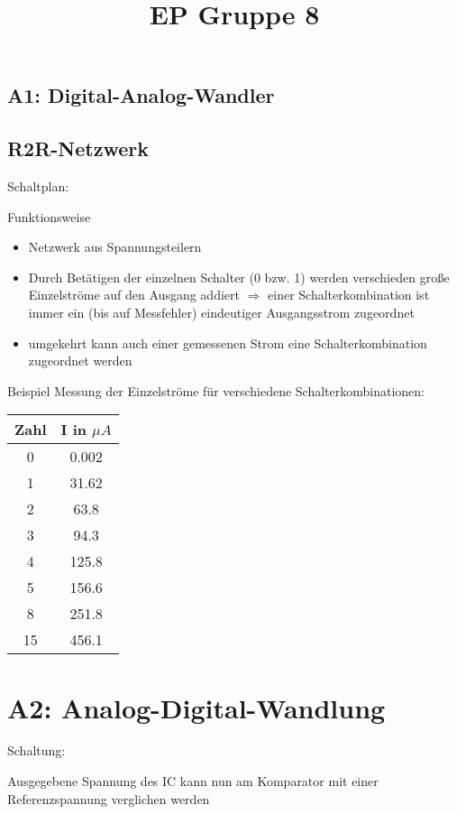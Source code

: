\documentclass[compress,11pt]{beamer}
\title{EP Gruppe 8}
\begin{document}
\begin{frame}

\section{A1: Digital-Analog-Wandler}

\subsection{R2R-Netzwerk}
Schaltplan:

\begin{block}{Funktionsweise}
\begin{itemize}
\item Netzwerk aus Spannungsteilern
\item Durch Betätigen der einzelnen Schalter (0 bzw. 1) werden verschieden große Einzelströme auf den Ausgang addiert $\Rightarrow$ einer Schalterkombination ist immer ein (bis auf Messfehler) eindeutiger Ausgangsstrom zugeordnet 
\item umgekehrt kann auch einer gemessenen Strom eine Schalterkombination zugeordnet werden
\end{itemize}
\end{block}

\end{frame}
\begin{frame}{Beispiel}
Messung der Einzelströme für verschiedene Schalterkombinationen:
\begin{tabular}{|c|c|}
\hline
Zahl & I in $\mu A$  \\
\hline
0 & 0.002 \\
1 & 31.62 \\
2 & 63.8 \\
3 & 94.3 \\
4 & 125.8 \\
5 & 156.6 \\
8 & 251.8 \\
15 & 456.1 \\
\hline
\end{tabular}


\end{frame}
\subsection{}








\section{A2: Analog-Digital-Wandlung}
\begin{frame}
Schaltung:

Ausgegebene Spannung des IC kann nun am Komparator mit einer Referenzspannung verglichen werden

\end{frame}
\begin{frame}

\end{frame}
\end{document}
